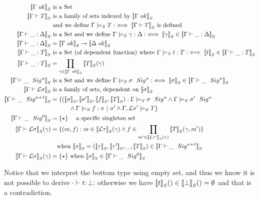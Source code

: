 \begin{align*}
  \denotesS{\goodCtx{\Gamma}{i}} & \text{ is a Set} \\
  \denotesS{\goodType{\Gamma}{T}{i}} & \text{ is a family of sets indexed by } \denotesS{\goodCtx{\Gamma}{i}} \\
  & \text{ and we define } \goodTypeS{\Gamma}{T}{i} : \iff \denotesS{\goodType{\Gamma}{T}{i}} \text{ is defined } \\
  \denotesS{\goodSub{\Gamma}{\_}{\Delta}} & \text{ is a Set and we define }  {\goodSubS{\Gamma}{\gamma}{\Delta}} : \iff \denotesS{\gamma} \in \denotesS{\goodSub{\Gamma}{\_}{\Delta}} \\
  \denotesS{\goodSub{\Gamma}{\_}{\Delta}} & = \denotesS{\goodCtx{\Gamma}{i}} \rightarrow \denotesS{\goodCtx{\Delta}{j}} \\
  \denotesS{\goodTerm{\Gamma}{\_}{T}} & \text{ is a Set (of dependent function) where }   {\goodTermS{\Gamma}{t}{T}} : \iff \denotesS{t} \in \denotesS{\goodTerm{\Gamma}{\_}{T}} \\
  \denotesS{\goodTerm{\Gamma}{\_}{T}} & = \prod_{\gamma \in \denotesS{\goodCtx{\Gamma}{i}}}\denotesS{T}(\gamma) \\
  \denotesS{\goodSig{\Gamma}{\_}{n}} & \text{ is a Set  and we define  } {\goodSigS{\Gamma}{\sigma}{n}} :\iff \denotesS{\sigma} \in  \denotesS{\goodSig{\Gamma}{\_}{n}} \\
  \denotesS{\goodType{\Gamma}{\cL \sigma}{i}} & \text{ is a family of sets, dependent on } \denotesS{\sigma}  \\
  \denotesS{\goodSig{\Gamma}{\_}{n+1}} &= \{
    (\denotesS{\sigma}, \denotesS{\sigma'}, \denotesS{f}, \denotesS{T}) :
      {\goodSigS{\Gamma}{\sigma}{n}}
      \land  {\goodSigS{\Gamma}{\sigma'}{n}} \\  
      & \quad \quad \quad \land  {\goodSealS{\Gamma}{f}{\sigma}{\sigma'}}
      \land  {\goodTypeS{\Gamma, \cL \sigma'}{T}{i}} 
  \} \\ 
  \denotesS{\goodSig{\Gamma}{\_}{0}} &= \{\star\} \quad \text{ a specific singleton set} \\
  \denotesS{\goodType{\Gamma}{\cL \sigma}{i}} (\gamma)&= \{(m, f) :  m \in \denotesS{\cL \tau}(\gamma) \land f \in \prod_{m' \in \denotesS{\cL \tau'}(\gamma)}\denotesS{T}(\gamma, m')  \}  \\
  & \quad \text{when } \denotesS{\sigma} = (\denotesS{\tau}, \denotesS{\tau'}, \_ , \denotesS{T}) \in \denotesS{\goodSig{\Gamma}{\_}{n+1}} \\
  \denotesS{\goodType{\Gamma}{\cL \sigma}{i}} (\gamma)&= \{\star\} \text{ when } \denotesS{\sigma} \in \denotesS{\goodSig{\Gamma}{\_}{0}} \\
\end{align*}


Notice that we interpret the bottom type using empty set, and thus we know it is not possible to derive $\cdot \vdash t : \bot$: otherwise we have  $\denotesS{t}() \in \denotesS{\bot}() = \emptyset$ 
and that is a contradiction.